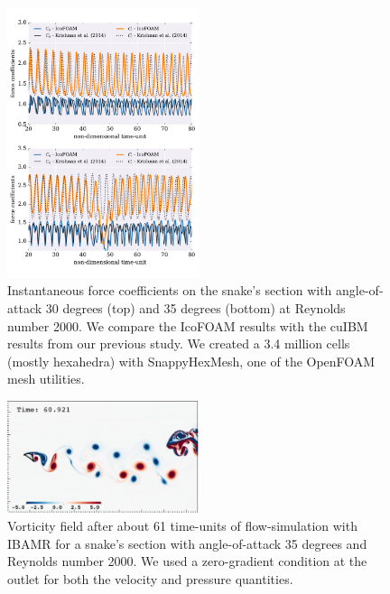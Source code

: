 \documentclass[9pt,twocolumn,twoside]{article}
\begin{document}
\begin{figure}[t]
\centering
\includegraphics[width=0.5\textwidth]{./figures/openfoam_forceCoefficientsRe2000.pdf}
\caption{
Instantaneous force coefficients on the snake's section with angle-of-attack 30 degrees (top) and 35 degrees (bottom) at Reynolds number 2000.
We compare the IcoFOAM results with the cuIBM results from our previous study.
We created a 3.4 million cells (mostly hexahedra) with SnappyHexMesh, one of the OpenFOAM mesh utilities.
}
\label{figure4}
\end{figure}

\begin{figure}
\centering
\includegraphics[width=0.5\textwidth]{./figures/ibamr_vorticity56Re2000AoA35_zeroGradientOutlet.pdf}
\caption{
Vorticity field after about 61 time-units of flow-simulation with IBAMR for a snake's section with angle-of-attack 35 degrees and Reynolds number 2000.
We used a zero-gradient condition at the outlet for both the velocity and pressure quantities.
}
\label{figure5}
\end{figure}
\end{document}
